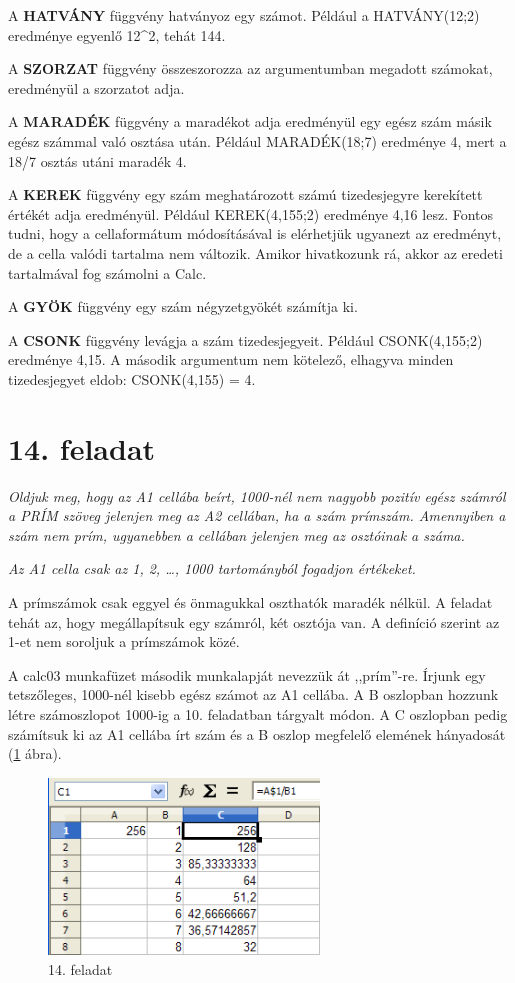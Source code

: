 A \textbf{HATVÁNY} függvény hatványoz egy számot. Például a
HATVÁNY(12;2) eredménye egyenlő 12\^{}2, tehát 144.

A \textbf{SZORZAT} függvény összeszorozza az argumentumban
megadott számokat, eredményül a szorzatot adja.

A \textbf{MARADÉK} függvény a maradékot adja eredményül egy
egész szám másik egész számmal való osztása után.
Például MARADÉK(18;7) eredménye 4, mert a 18/7 osztás utáni
maradék 4.

A \textbf{KEREK} függvény egy szám meghatározott számú
tizedesjegyre kerekített értékét adja eredményül.
Például KEREK(4,155;2) eredménye 4,16 lesz. Fontos tudni, hogy a
cellaformátum módosításával is elérhetjük ugyanezt az
eredményt, de a cella valódi tartalma nem változik. Amikor
hivatkozunk rá, akkor az eredeti tartalmával fog számolni a Calc.

A \textbf{GYÖK} függvény egy szám négyzetgyökét számítja
ki.

A \textbf{CSONK} függvény levágja a szám tizedesjegyeit.
Például CSONK(4,155;2) eredménye 4,15. A második argumentum nem
kötelező, elhagyva minden tizedesjegyet eldob: CSONK(4,155) = 4.


\section{14. feladat}
{\itshape
Oldjuk meg, hogy az A1 cellába beírt, 1000-nél nem nagyobb
pozitív egész számról a PRÍM szöveg jelenjen meg az A2
cellában, ha a szám prímszám. Amennyiben a szám nem prím,
ugyanebben a cellában jelenjen meg az osztóinak a száma.}

{\itshape
Az A1 cella csak az 1, 2, {\dots}, 1000 tartományból fogadjon
értékeket.}

A prímszámok csak eggyel és önmagukkal
oszthatók maradék nélkül. A feladat tehát az, hogy
megállapítsuk egy számról, két osztója van. A definíció
szerint az 1-et nem soroljuk a prímszámok közé.

A calc03 munkafüzet második munkalapját nevezzük át
,,prím''-re. Írjunk egy
tetszőleges, 1000-nél kisebb egész számot az A1 cellába. A
B oszlopban hozzunk létre számoszlopot 1000-ig a 10. feladatban
tárgyalt módon. A C oszlopban pedig számítsuk ki az A1
cellába írt szám és a B oszlop megfelelő elemének
hányadosát (\ref{14-feladat} ábra).

\begin{figure}[!h]
\begin{center}
\includegraphics[width=7.203cm]{oocalcv2-img77.png}
\caption{14. feladat}\label{14-feladat}
\end{center}
\end{figure}


